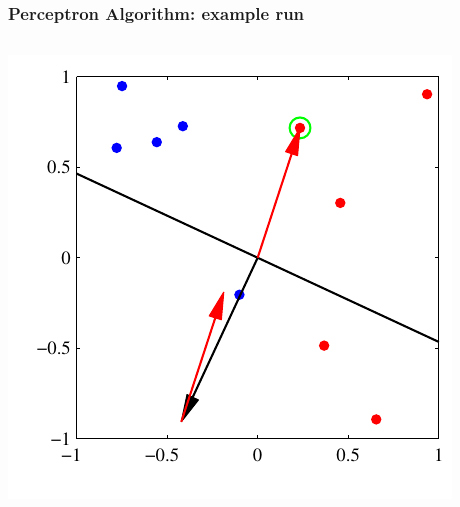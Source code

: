 \documentclass[ignorenonframetext,plain,fleqn]{beamer}
\begin{document}
\begin{frame}\frametitle{Perceptron Algorithm: example run}
\begin{columns}
\includegraphics[height=.4\textheight]{images/bishop-fig-4-7a.pdf}

\end{columns}
\end{frame}
\end{document}
